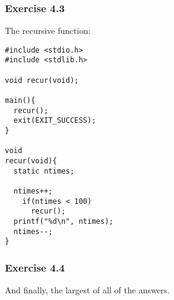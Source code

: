   

  \subsubsection*{Exercise 4.3}

   The recursive function:


   \begin{Verbatim}
#include <stdio.h>
#include <stdlib.h>

void recur(void);

main(){
  recur();
  exit(EXIT_SUCCESS);
}

void
recur(void){
  static ntimes;

  ntimes++;
    if(ntimes < 100)
      recur();
  printf("%d\n", ntimes);
  ntimes--;
}
\end{Verbatim}

  

  \subsubsection*{Exercise 4.4}

   And finally, the largest of all of the answers.


